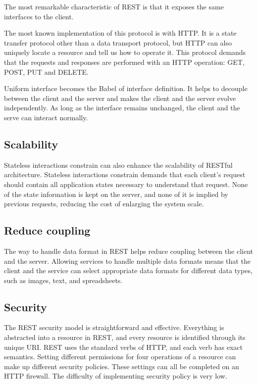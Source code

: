 \documentclass[conference]{IEEEtran}
\begin{document}
The most remarkable characteristic of REST is that it exposes the same interfaces to the client. 

The most known implementation of this protocol is with HTTP. It is a state transfer protocol other than a data transport protocol, but HTTP can also uniquely locate a resource and tell us how to operate it. This protocol demands that the requests and responses are performed with an HTTP operation: GET, POST, PUT and DELETE. 

Uniform interface becomes the Babel of interface definition. It helps to decouple between the client and the server and makes the client and the server evolve independently. As long as the interface remains unchanged, the client and the serve can interact normally.

\subsection{Scalability}

Stateless interactions constrain can also enhance the scalability of RESTful architecture. Stateless interactions constrain demands that each client's request should contain all application states necessary to understand that request. None of the state information is kept on the server, and none of it is implied by previous requests, reducing the cost of enlarging the system scale. 

\subsection{Reduce coupling}

The way to handle data format in REST helps reduce coupling between the client and the server. Allowing services to handle multiple data formats means that the client and the service can select appropriate data formats for different data types, such as images, text, and spreadsheets.

\subsection{Security}

The REST security model is straightforward and effective. Everything is abstracted into a resource in REST, and every resource is identified through its unique URI. REST uses the standard verbs of HTTP, and each verb has exact semantics. Setting different permissions for four operations of a resource can make up different security policies. These settings can all be completed on an HTTP firewall. The difficulty of implementing security policy is very low.
\end{document}
